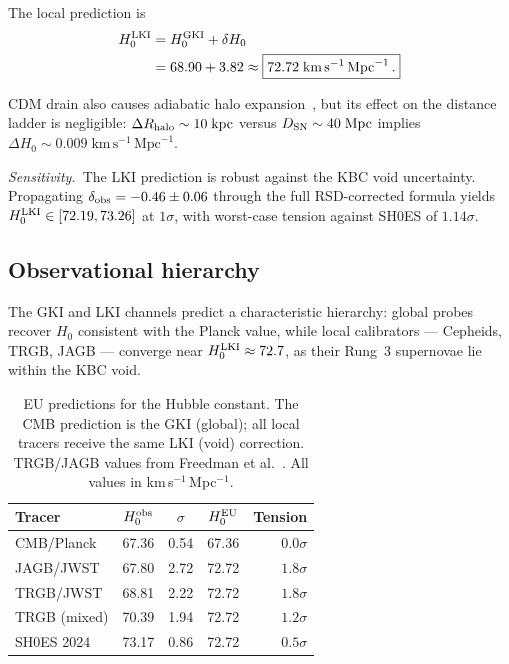 \documentclass[a4paper,fleqn]{cas-dc}
\begin{document}
The local prediction is
\begin{align}
H_0^{\rm LKI}
  &= H_0^{\rm GKI} + \delta H_0
  \notag \\
  &= 68.90 + 3.82
  \approx \boxed{72.72\;\text{km}\,\text{s}^{-1}\,\text{Mpc}^{-1}\,.}
\label{eq:H0_lki}
\end{align}

CDM drain also causes adiabatic halo expansion~\cite{gnedin2004},
but its effect on the distance ladder is negligible:
$\Delta R_{\rm halo} \sim 10\;\text{kpc}$ versus
$D_{\rm SN} \sim 40\;\text{Mpc}$ implies
$\Delta H_0 \sim 0.009\;\text{km}\,\text{s}^{-1}\,\text{Mpc}^{-1}$.

\textit{Sensitivity.}~The LKI prediction is robust against the
KBC void uncertainty. Propagating
$\delta_{\rm obs} = -0.46 \pm 0.06$ through the full
RSD-corrected formula yields
$H_0^{\rm LKI} \in [72.19, 73.26]$ at $1\sigma$, with worst-case
tension against SH0ES of $1.14\sigma$.


\subsection{Observational hierarchy}
\label{sec:hierarchy}

The GKI and LKI channels predict a characteristic
hierarchy: global probes recover $H_0$ consistent with
the Planck value, while local calibrators --- Cepheids,
TRGB, JAGB --- converge near
$H_0^{\rm LKI} \approx 72.7$, as their Rung~3 supernovae
lie within the KBC void.

\begin{table}[pos=!htbp]
\caption{EU predictions for the Hubble constant. The CMB prediction
is the GKI (global); all local tracers receive the same LKI (void)
correction. TRGB/JAGB values from
Freedman et al.~\cite{freedman2024}.
All values in km\,s$^{-1}$\,Mpc$^{-1}$.}
\label{tab:hierarchy}
\begin{tabular}{lcccr}
Tracer & $H_0^{\rm obs}$ & $\sigma$ & $H_0^{\rm EU}$ & Tension \\
\hline
CMB/Planck       & 67.36 & 0.54 & 67.36 & $0.0\sigma$ \\
JAGB/JWST        & 67.80 & 2.72 & 72.72 & $1.8\sigma$ \\
TRGB/JWST        & 68.81 & 2.22 & 72.72 & $1.8\sigma$ \\
TRGB (mixed)     & 70.39 & 1.94 & 72.72 & $1.2\sigma$ \\
SH0ES 2024       & 73.17 & 0.86 & 72.72 & $0.5\sigma$ \\
\end{tabular}
\end{table}
\end{document}
